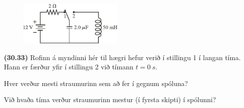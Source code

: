 \ifdefined \wholebook \else\documentclass[oneside]{book}\usepackage{EdlBook}\graphicspath{{figures/}}
\begin{document}
\begin{enumerate}[label = \textbf{(\alph*)}]
\begin{minipage}{\linewidth}
\begin{figure}
\vspace{-0.5cm}
\includegraphics[width = 2in]{figures/rk3033c.pdf}
\end{figure}

\item[\textbf{(30.33)}] Rofinn á myndinni hér til hægri hefur verið í stillingu 1 í langan tíma. Hann er færður yfir í stillingu 2 við tímann $t = \SI{0}{s}$. \begin{enumerate*}[label = \textbf{(\alph*)}]
    \item Hver verður mesti straumurinn sem að fer í gegnum spóluna?
    \item Við hvaða tíma verður straumurinn mestur (í fyrsta skipti) í spólunni?
\end{enumerate*}

\vspace{1cm}

\end{minipage}

\end{enumerate}
\end{document}
